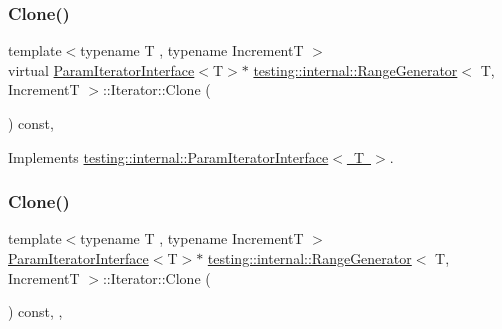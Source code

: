 \subsubsection{\texorpdfstring{Clone()}{Clone()}\hspace{0.1cm}{\footnotesize\ttfamily [1/3]}}
{\footnotesize\ttfamily template$<$typename T , typename IncrementT $>$ \\
virtual \mbox{\hyperlink{classtesting_1_1internal_1_1_param_iterator_interface}{Param\+Iterator\+Interface}}$<$T$>$$\ast$ \mbox{\hyperlink{classtesting_1_1internal_1_1_range_generator}{testing\+::internal\+::\+Range\+Generator}}$<$ T, IncrementT $>$\+::Iterator\+::\+Clone (\begin{DoxyParamCaption}{ }\end{DoxyParamCaption}) const\hspace{0.3cm}{\ttfamily [inline]}, {\ttfamily [virtual]}}



Implements \mbox{\hyperlink{classtesting_1_1internal_1_1_param_iterator_interface_a4998c23e27e2943d97546011aa35db80}{testing\+::internal\+::\+Param\+Iterator\+Interface$<$ T $>$}}.

\mbox{\label{classtesting_1_1internal_1_1_range_generator_1_1_iterator_a61a764294b66272d730f5ff5e0acdcf4}} 
\subsubsection{\texorpdfstring{Clone()}{Clone()}\hspace{0.1cm}{\footnotesize\ttfamily [2/3]}}
{\footnotesize\ttfamily template$<$typename T , typename IncrementT $>$ \\
\mbox{\hyperlink{classtesting_1_1internal_1_1_param_iterator_interface}{Param\+Iterator\+Interface}}$<$T$>$$\ast$ \mbox{\hyperlink{classtesting_1_1internal_1_1_range_generator}{testing\+::internal\+::\+Range\+Generator}}$<$ T, IncrementT $>$\+::Iterator\+::\+Clone (\begin{DoxyParamCaption}{ }\end{DoxyParamCaption}) const\hspace{0.3cm}{\ttfamily [inline]}, {\ttfamily [override]}, {\ttfamily [virtual]}}




